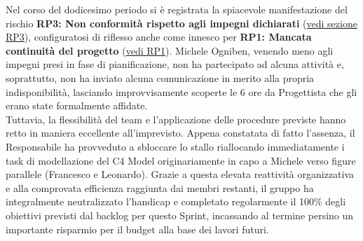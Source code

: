 \documentclass[a4paper, 11pt, oneside]{scrartcl} %
\begin{document}
Nel corso del dodicesimo periodo si è registrata la spiacevole manifestazione del rischio \textbf{RP3: Non conformità rispetto agli impegni dichiarati} (\hyperref[sec:rp3]{vedi sezione RP3}), configuratosi di riflesso anche come innesco per \textbf{RP1: Mancata continuità del progetto} (\hyperref[sec:rp1]{vedi RP1}).
Michele Ogniben, venendo meno agli impegni presi in fase di pianificazione, non ha partecipato ad alcuna attività e, soprattutto, non ha inviato alcuna comunicazione in merito alla propria indisponibilità, lasciando improvvisamente scoperte le 6 ore da Progettista che gli erano state formalmente affidate.\\
Tuttavia, la flessibilità del team e l'applicazione delle procedure previste hanno retto in maniera eccellente all'imprevisto. Appena constatata di fatto l'assenza, il Responsabile ha provveduto a sbloccare lo stallo riallocando immediatamente i task di modellazione del C4 Model originariamente in capo a Michele verso figure parallele (Francesco e Leonardo). Grazie a questa elevata reattività organizzativa e alla comprovata efficienza raggiunta dai membri restanti, il gruppo ha integralmente neutralizzato l'handicap e completato regolarmente il 100\% degli obiettivi previsti dal backlog per questo Sprint, incassando al termine persino un importante risparmio per il budget alla base dei lavori futuri.
\end{document}
